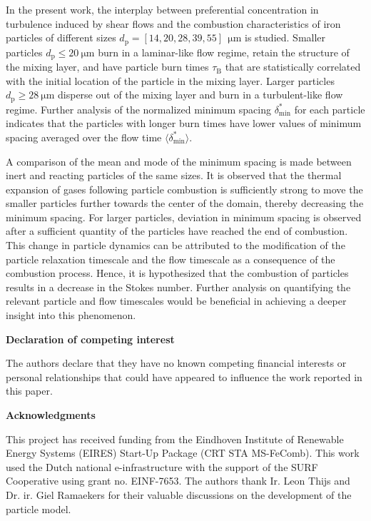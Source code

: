 \documentclass[twocolumn,10pt,dvipsnames]{article} %
\newcommand{\mrm}[1]{\mathrm{#1}}
\newcommand{\acknowledgement}%
              [1]%
              {%
               \bgroup%
               \flushleft%
               \small\bf%
               #1%
               \par%
               \egroup%
              }%
\begin{document}
In the present work, the interplay between preferential concentration in turbulence induced by shear flows and the combustion characteristics of iron particles of different sizes $d_\mrm{p} = [14,20,28,39,55]\ \SI{}{\micro\meter}$ is studied. Smaller particles $d_\mrm{p} \leq \SI{20}{\micro\meter}$ burn in a laminar-like flow regime, retain the structure of the mixing layer, and have particle burn times $\tau_\mrm{B}$ that are statistically correlated with the initial location of the particle in the mixing layer. Larger particles $d_\mrm{p} \geq \SI{28}{\micro\meter}$ disperse out of the mixing layer and burn in a turbulent-like flow regime. Further analysis of the normalized minimum spacing $\delta_\mrm{min}^*$ for each particle indicates that the particles with longer burn times have lower values of minimum spacing averaged over the flow time $\langle \delta_\mrm{min}^* \rangle$. 

A comparison of the mean and mode of the minimum spacing is made between inert and reacting particles of the same sizes. It is observed that the thermal expansion of gases following particle combustion is sufficiently strong to move the smaller particles further towards the center of the domain, thereby decreasing the minimum spacing. For larger particles, deviation in minimum spacing is observed after a sufficient quantity of the particles have reached the end of combustion. This change in particle dynamics can be attributed to the modification of the particle relaxation timescale and the flow timescale as a consequence of the combustion process. Hence, it is hypothesized that the combustion of particles results in a decrease in the Stokes number. Further analysis on quantifying the relevant particle and flow timescales would be beneficial in achieving a deeper insight into this phenomenon. 

\acknowledgement{Declaration of competing interest} \addvspace{10pt}
The authors declare that they have no known competing financial interests or personal relationships that could have appeared to influence the work reported in this paper.

\acknowledgement{Acknowledgments} \addvspace{10pt}

This project has received funding from the Eindhoven Institute of Renewable Energy Systems (EIRES) Start-Up Package (CRT STA MS-FeComb). This work used the Dutch national e-infrastructure with the support of the
SURF Cooperative using grant no. EINF-7653. The authors thank Ir. Leon Thijs and Dr. ir. Giel Ramaekers for their valuable discussions on the development of the particle model.
\end{document}
